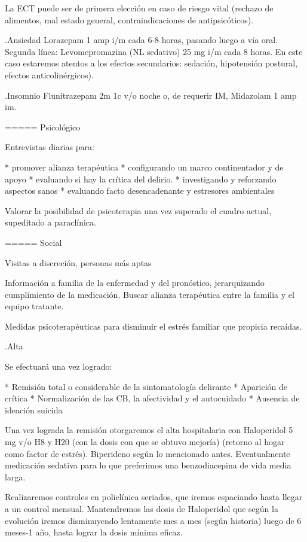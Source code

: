 \documentclass{scrbook}
\begin{document}
La ECT puede ser de primera elección en caso de riesgo vital (rechazo de alimentos, mal estado general, contraindicaciones de antipsicóticos).

.Ansiedad
Lorazepam 1 amp i/m cada 6-8 horas, pasando luego a vía oral. Segunda línea: Levomepromazina (NL sedativo) 25 mg i/m cada 8 horas. En este caso estaremos atentos a los efectos secundarios: sedación, hipotensión postural, efectos anticolinérgicos).

.Insomnio
Flunitrazepam 2m 1c v/o noche o, de requerir IM, Midazolam 1 amp im.


===== Psicológico

Entrevistas diarias para:

* promover alianza terapéutica
* configurando un marco continentador y de apoyo
* evaluando si hay la crítica del delirio.
* investigando y reforzando aspectos sanos
* evaluando facto desencadenante y estresores ambientales

Valorar la posibilidad de psicoterapia una vez superado el cuadro actual, supeditado a paraclínica.

===== Social

Visitas a discreción, personas más aptas

Información a familia de la enfermedad y del pronóstico, jerarquizando cumplimiento de la medicación. Buscar alianza terapéutica entre la familia y el equipo tratante.

Medidas psicoterapéuticas para disminuir el estrés familiar que propicia recaídas.

.Alta

Se efectuará una vez logrado:

* Remisión total o considerable de la sintomatología delirante
* Aparición de crítica
* Normalización de las CB, la afectividad y el autocuidado
* Ausencia de ideación suicida


Una vez lograda la remisión otorgaremos el alta hospitalaria con Haloperidol 5 mg v/o H8 y H20 (con la dosis con que se obtuvo mejoría) (retorno al hogar como factor de estrés). Biperideno según lo mencionado antes. Eventualmente medicación sedativa para lo que preferimos una benzodiacepina de vida media larga.

Realizaremos controles en policlínica seriados, que iremos espaciando hasta llegar a un control mensual. Mantendremos las dosis de Haloperidol que según la evolución iremos disminuyendo lentamente mes a mes (según historia) luego de 6 meses-1 año, hasta lograr la dosis mínima eficaz.
\end{document}
